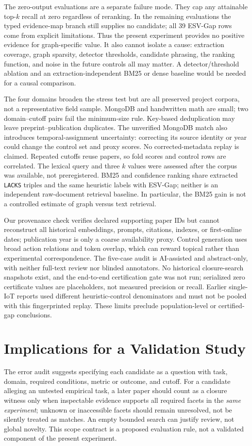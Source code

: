 \documentclass[conference,a4paper]{IEEEtran}
\begin{document}
The zero-output evaluations are a separate failure mode. They cap any attainable top-$k$ recall at zero regardless of reranking. In the remaining evaluations the typed evidence-map branch still supplies no candidate; all 39 ESV-Gap rows come from explicit limitations. Thus the present experiment provides no positive evidence for graph-specific value. It also cannot isolate a cause: extraction coverage, graph sparsity, detector thresholds, candidate phrasing, the ranking function, and noise in the future controls all may matter. A detector/threshold ablation and an extraction-independent BM25 or dense baseline would be needed for a causal comparison.

The four domains broaden the stress test but are all preserved project corpora, not a representative field sample. MongoDB and handwritten math are small; two domain--cutoff pairs fail the minimum-size rule. Key-based deduplication may leave preprint--publication duplicates. The unverified MongoDB match also introduces temporal-assignment uncertainty: correcting its source identity or year could change the control set and proxy scores. No corrected-metadata replay is claimed. Repeated cutoffs reuse papers, so fold scores and control rows are correlated. The lexical query and three $k$ values were assessed after the corpus was available, not preregistered. BM25 and confidence ranking share extracted \texttt{LACKS} triples and the same heuristic labels with ESV-Gap; neither is an independent raw-document retrieval baseline. In particular, the BM25 gain is not a controlled estimate of graph versus text retrieval.

Our provenance check verifies declared supporting paper IDs but cannot reconstruct all historical embeddings, prompts, citations, indexes, or first-online dates; publication year is only a coarse availability proxy. Control generation uses broad action relations and token overlap, which can reward topical rather than experimental correspondence. The five-case audit is AI-assisted and abstract-only, with neither full-text review nor blinded annotators. No historical closure-search snapshots exist, and the end-to-end certification gate was not run; serialized zero certificate values are placeholders, not measured precision or recall. Earlier single-IoT reports used different heuristic-control denominators and must not be pooled with this fingerprinted replay. These limits preclude population-level or certified-gap conclusions.

\section{Implications for a Validation Study}
The error audit suggests specifying each candidate as a question with task, domain, required conditions, metric or outcome, and cutoff. For a candidate alleging an untested empirical task, a later paper should count as a closure witness only when inspectable evidence supports all required facets in the \emph{same experiment}; unknown or inaccessible facets should remain unresolved, not be silently treated as matches. An empty bounded search can justify review, not global novelty. This scope contract is a proposed evaluation rule, not a validated component of the present experiment.
\end{document}
